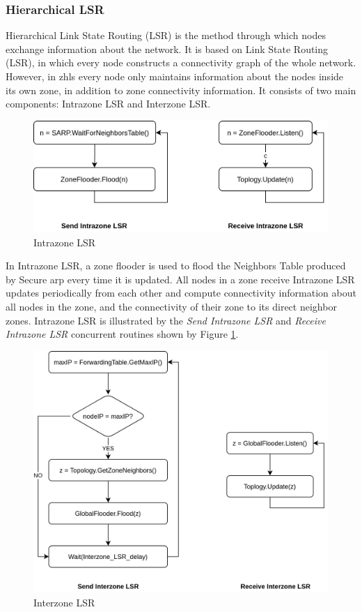 \subsubsection{Hierarchical LSR}

\qquad Hierarchical Link State Routing (LSR) is the method through which nodes exchange information about the network. It is based on Link State Routing (LSR), in which every node constructs a connectivity graph of the whole network. However, in \acrshort{zhls} every node only maintains information about the nodes inside its own zone, in addition to zone connectivity information. It consists of two main components: Intrazone LSR and Interzone LSR.

\begin{figure}[!htb]
    \centering
    \includegraphics[width=\linewidth]{images/lsr_flowchart-intrazone.png}
    \caption{Intrazone LSR}
    \label{fig:intrazone-lsr}
\end{figure} 

In Intrazone LSR, a zone flooder is used to flood the Neighbors Table produced by Secure \acrshort{arp} every time it is updated. All nodes in a zone receive Intrazone LSR updates periodically from each other and compute connectivity information about all nodes in the zone, and the connectivity of their zone to its direct neighbor zones. Intrazone LSR is illustrated by the \textit{Send Intrazone LSR} and \textit{Receive Intrazone LSR} concurrent routines shown by Figure \ref{fig:intrazone-lsr}.

\begin{figure}[!htb]
    \centering
    \includegraphics[width=\linewidth]{images/lsr_flowchart-interzone.png}
    \caption{Interzone LSR}
    \label{fig:interzone-lsr}
\end{figure}

